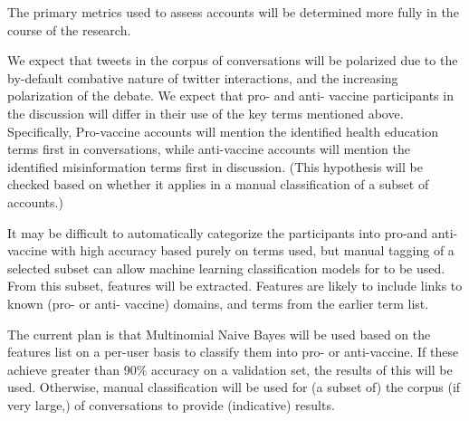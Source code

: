 \documentclass{article}
\begin{document}
The primary metrics used to assess accounts will be determined more fully in the course of the research.

We expect that tweets in the corpus of conversations will be polarized due to the by-default combative nature of twitter interactions, and the increasing polarization of the debate. We expect that pro- and anti- vaccine participants in the discussion will differ in their use of the key terms mentioned above. Specifically, Pro-vaccine accounts will mention the identified health education terms first in conversations, while anti-vaccine accounts will mention the identified misinformation terms first in discussion. (This hypothesis will be checked based on whether it applies in a manual classification of a subset of accounts.)

It may be difficult to automatically categorize the participants into pro-and anti-vaccine with high accuracy based purely on terms used, but manual tagging of a selected subset can allow machine learning classification models for to be used. From this subset, features will be extracted. Features are likely to include links to known (pro- or anti- vaccine) domains, and terms from the earlier term list.

The current plan is that Multinomial Naive Bayes will be used based on the features list on a per-user basis to classify them into pro- or anti-vaccine. If these achieve greater than 90\% accuracy on a validation set, the results of this will be used. Otherwise, manual classification will be used for (a subset of) the corpus (if very large,) of conversations to provide (indicative) results.



\end{document}
